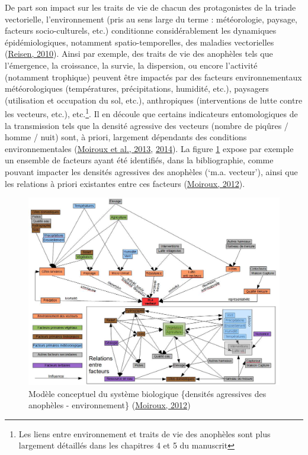 \documentclass[12pt,twoside]{reedthesis}
\begin{document}
De part son impact sur les traits de vie de chacun des protagonistes de la triade vectorielle, l'environnement (pris au sens large du terme : météorologie, paysage, facteurs socio-culturels, etc.) conditionne considérablement les dynamiques épidémiologiques, notamment spatio-temporelles, des maladies vectorielles (\protect\hyperlink{ref-reisen_landscape_2010}{Reisen, 2010}). Ainsi par exemple, des traits de vie des anophèles tels que l'émergence, la croissance, la survie, la dispersion, ou encore l'activité (notamment trophique) peuvent être impactés par des facteurs environnementaux météorologiques (températures, précipitations, humidité, etc.), paysagers (utilisation et occupation du sol, etc.), anthropiques (interventions de lutte contre les vecteurs, etc.), etc.\footnote{Les liens entre environnement et traits de vie des anophèles sont plus largement détaillés dans les chapitres 4 et 5 du manuscrit}. Il en découle que certains indicateurs entomologiques de la transmission tels que la densité agressive des vecteurs (nombre de piqûres / homme / nuit) sont, à priori, largement dépendants des conditions environnementales (\protect\hyperlink{ref-moiroux_modelling_2013}{Moiroux et al., 2013}, \protect\hyperlink{ref-moiroux_spatio-temporal_2014}{2014}). La figure \ref{fig:complex-system-anopheles} expose par exemple un ensemble de facteurs ayant été identifiés, dans la bibliographie, comme pouvant impacter les densités agressives des anophèles (`m.a. vecteur'), ainsi que les relations à priori existantes entre ces facteurs (\protect\hyperlink{ref-moiro2012}{Moiroux, 2012}).
\begin{figure}

{\centering \includegraphics[width=1\linewidth]{figure/systeme_complexe_abondance_vecteurs} 

}

\caption[Modèle conceptuel du système \{densités agressives des anophèles - environnement\}]{Modèle conceptuel du système biologique \{densités agressives des anophèles - environnement\} (\protect\hyperlink{ref-moiro2012}{Moiroux, 2012})}\label{fig:complex-system-anopheles}
\end{figure}
\end{document}
